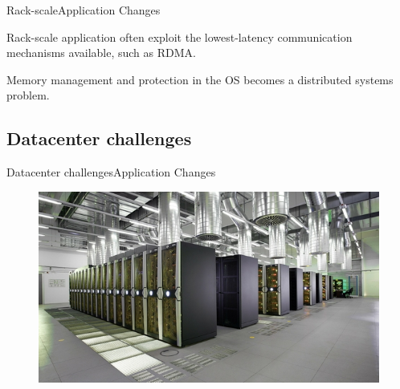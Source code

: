 \documentclass[10pt]{beamer}
\begin{document}
\begin{frame}{Rack-scale}{Application Changes}
  \begin{block}{}
    Rack-scale application often exploit the lowest-latency communication
    mechanisms available, such as RDMA.
  \end{block}

  \begin{block}{}
    Memory management and protection in the OS becomes a distributed
    systems problem.
  \end{block}
 
\end{frame}
\subsection{Datacenter challenges}
\begin{frame}{Datacenter challenges}{Application Changes}
  \begin{figure}[ht]
    \centering
    \includegraphics[width=1\textwidth, keepaspectratio=true]{images/datacenter.jpg}
  \end{figure}
\end{frame}
\end{document}
